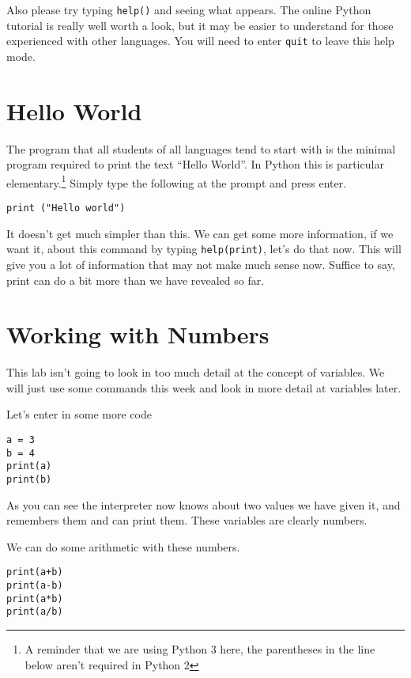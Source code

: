 \documentclass[12pt,oneside]{cttutorial}
\begin{document}
Also please try typing \lstinline!help()! and seeing what appears. The online Python tutorial is really well worth a look, but it may be
easier to understand for those experienced with other languages. You will need to enter \lstinline!quit! to leave this help mode.

\section{Hello World}

The program that all students of all languages tend to start with is the minimal program required to print the text ``Hello World''.
In Python this is particular elementary.\footnote
{
A reminder that we are using Python 3 here, the parentheses in the line below aren't required in Python 2
}
Simply type the following at the prompt and press enter.

\begin{lstlisting}
print ("Hello world")
\end{lstlisting}

It doesn't get much simpler than this. We can get some more information, if we want it, about this command by typing \lstinline!help(print)!,
let's do that now. This will give you a lot of information that may not make much sense now. Suffice to say, print can do a bit more than we 
have revealed so far.

\section{Working with Numbers}

This lab isn't going to look in too much detail at the concept of variables. We will just use some commands this week and look in more
detail at variables later.

Let's enter in some more code

\begin{lstlisting}
a = 3
b = 4
print(a)
print(b)
\end{lstlisting}

As you can see the interpreter now knows about two values we have given it, and remembers them and can print them. These
variables are clearly numbers.

We can do some arithmetic with these numbers.

\begin{lstlisting}
print(a+b)
print(a-b)
print(a*b)
print(a/b)
\end{lstlisting}
\end{document}
